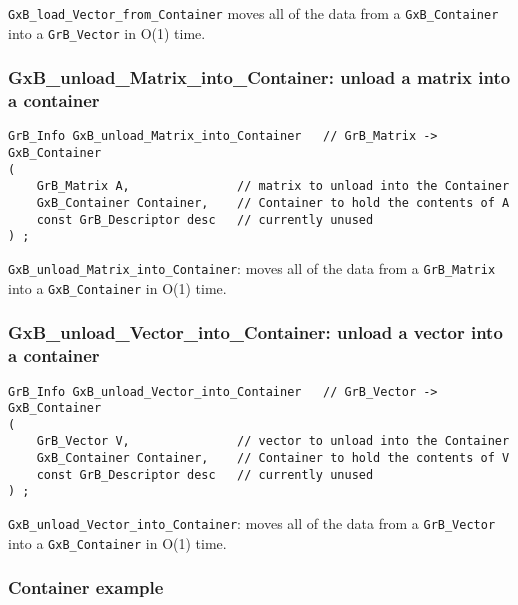 \verb'GxB_load_Vector_from_Container' moves all of the data from a
\verb'GxB_Container' into a \verb'GrB_Vector' in O(1) time.

\subsubsection{{\sf GxB\_unload\_Matrix\_into\_Container:} unload a matrix into a container}
\label{unload_matrix_into_container}

\begin{mdframed}[userdefinedwidth=6in]
{\footnotesize
\begin{verbatim}
GrB_Info GxB_unload_Matrix_into_Container   // GrB_Matrix -> GxB_Container
(
    GrB_Matrix A,               // matrix to unload into the Container
    GxB_Container Container,    // Container to hold the contents of A
    const GrB_Descriptor desc   // currently unused
) ;
\end{verbatim}
} \end{mdframed}

\verb'GxB_unload_Matrix_into_Container': moves all of the data from
a \verb'GrB_Matrix' into a \verb'GxB_Container' in O(1) time.

\newpage
\subsubsection{{\sf GxB\_unload\_Vector\_into\_Container:} unload a vector into a container}
\label{unload_vector_into_container}

\begin{mdframed}[userdefinedwidth=6in]
{\footnotesize
\begin{verbatim}
GrB_Info GxB_unload_Vector_into_Container   // GrB_Vector -> GxB_Container
(
    GrB_Vector V,               // vector to unload into the Container
    GxB_Container Container,    // Container to hold the contents of V
    const GrB_Descriptor desc   // currently unused
) ;
\end{verbatim}
} \end{mdframed}

\verb'GxB_unload_Vector_into_Container': moves all of the data from
a \verb'GrB_Vector' into a \verb'GxB_Container' in O(1) time.

\subsubsection{Container example}
\label{container_example}

